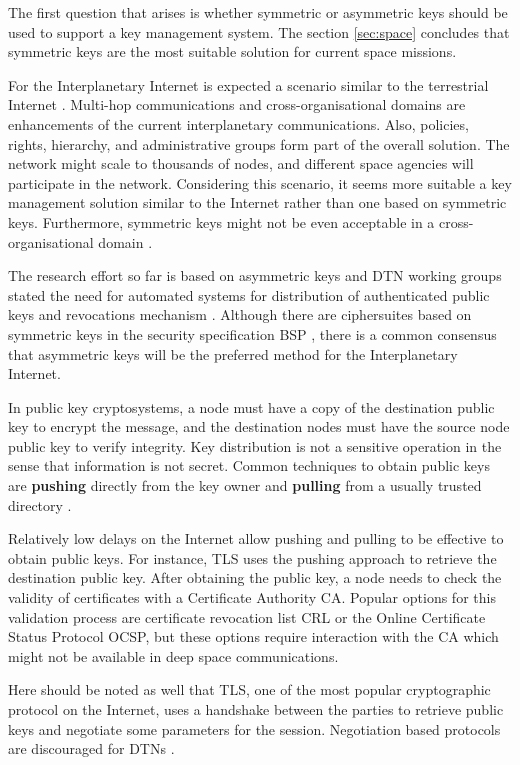 The first question that arises is whether symmetric or asymmetric keys should be used to support a key management system.  The section  \ref{sec:space} concludes that symmetric keys are the most suitable solution for current space missions. 

For the Interplanetary Internet is expected a scenario similar to the terrestrial Internet \cite{rationale2010requirements}. Multi-hop communications and cross-organisational domains are enhancements of the current interplanetary communications. Also, policies, rights, hierarchy, and administrative groups form part of the overall solution. The network might scale to thousands of nodes, and different space agencies will participate in the network. Considering this scenario, it seems more suitable a key management solution similar to the Internet rather than one based on symmetric keys. Furthermore, symmetric keys might not be even acceptable in a cross-organisational domain \cite{ivancic2009security}.

The research effort so far is based on asymmetric keys and DTN working groups stated the need for automated systems for distribution of authenticated public keys and revocations mechanism \cite{templin-dtnskmps-00}. Although there are ciphersuites based on symmetric keys in the security specification BSP \cite{ietf-dtn-bpsec-07}, there is a common consensus that asymmetric keys will be the preferred method for the Interplanetary Internet. 

In public key cryptosystems, a node must have a copy of the destination public key to encrypt the message, and the destination nodes must have the source node public key to verify integrity. Key distribution is not a sensitive operation in the sense that information is not secret.  Common techniques  to obtain public keys are \textbf{pushing} directly from the key owner and \textbf{pulling} from a usually trusted directory \cite{martineveryday}.

Relatively low delays on the Internet allow pushing and pulling to be effective to obtain public keys. For instance, TLS uses the pushing approach to retrieve the destination public key. After obtaining the public key, a node needs to check the validity of certificates with a Certificate Authority CA. Popular options for this validation process are certificate revocation list CRL or the Online Certificate Status Protocol OCSP, but these options require interaction with the CA which might not be available in deep space communications. 

Here should be noted as well that TLS, one of the most popular cryptographic protocol on the Internet, uses a handshake between the parties to retrieve public keys and negotiate some parameters for the session. Negotiation based protocols are discouraged for DTNs \cite{fall2003delay,cerf2007delay}.

